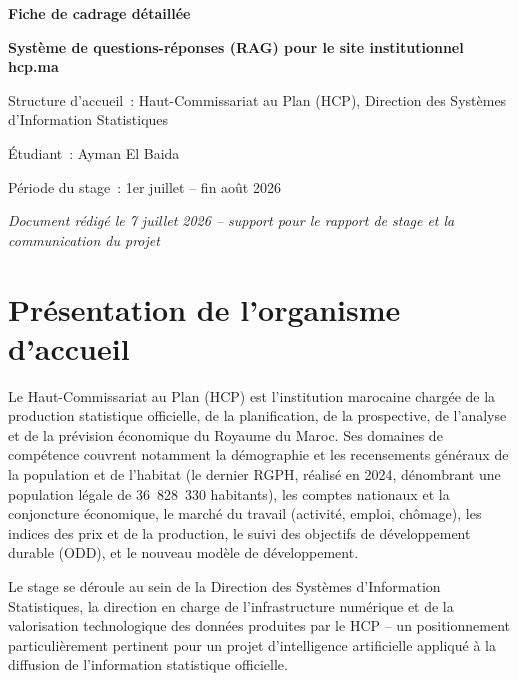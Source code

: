 \documentclass[11pt,a4paper]{article}
\begin{document}
\begin{titlepage}
\centering
\vspace*{2cm}
{\Huge\bfseries\color{navy} Fiche de cadrage d\'etaill\'ee\par}
\vspace{0.5cm}
{\Large\bfseries\color{gold} Syst\`eme de questions-r\'eponses (RAG) pour le site institutionnel hcp.ma\par}
\vspace{1.5cm}
{\large\color{greytext} Structure d'accueil~: Haut-Commissariat au Plan (HCP), Direction des Syst\`emes d'Information Statistiques\par}
\vspace{0.3cm}
{\large\color{greytext} \'Etudiant~: Ayman El Baida\par}
\vspace{0.3cm}
{\large\color{greytext} P\'eriode du stage~: 1er juillet -- fin ao\^ut 2026\par}
\vspace{0.3cm}
{\large\itshape\color{greytext} Document r\'edig\'e le 7 juillet 2026 -- support pour le rapport de stage et la communication du projet\par}
\vfill
\end{titlepage}

\tableofcontents
\newpage

\section{Pr\'esentation de l'organisme d'accueil}
Le Haut-Commissariat au Plan (HCP) est l'institution marocaine charg\'ee de la production statistique officielle, de la planification, de la prospective, de l'analyse et de la pr\'evision \'economique du Royaume du Maroc. Ses domaines de comp\'etence couvrent notamment la d\'emographie et les recensements g\'en\'eraux de la population et de l'habitat (le dernier RGPH, r\'ealis\'e en 2024, d\'enombrant une population l\'egale de 36~828~330 habitants), les comptes nationaux et la conjoncture \'economique, le march\'e du travail (activit\'e, emploi, ch\^omage), les indices des prix et de la production, le suivi des objectifs de d\'eveloppement durable (ODD), et le nouveau mod\`ele de d\'eveloppement.

Le stage se d\'eroule au sein de la Direction des Syst\`emes d'Information Statistiques, la direction en charge de l'infrastructure num\'erique et de la valorisation technologique des donn\'ees produites par le HCP -- un positionnement particuli\`erement pertinent pour un projet d'intelligence artificielle appliqu\'e \`a la diffusion de l'information statistique officielle.
\end{document}
